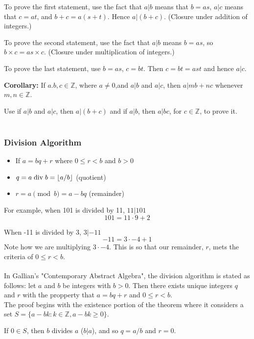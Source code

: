 To prove the first statement, use the fact that $a|b$ means that $b = as$,
$a|c$ means that $c=at$,
and $b+c = a(s+t)$.
Hence $a|(b+c)$.
(Closure under addition of integers.)

To prove the second statement, use the fact that $a|b$ means $b = as$, so $b\times c = as \times c$.
(Closure under multiplication of integers.)

To prove the last statement, use $b = as$, $c = bt$. Then $c = bt = ast$ and hence $a|c$.

\textbf{Corollary:}
If $a. b, c \in \mathbb{Z}$, where $a \neq 0$,and $a|b$ and $a|c$, then $a|mb + nc$ whenever $m, n \in \mathbb{Z}$.

Use if $a|b$ and $a|c$, then $a|(b+c)$ and if $a|b$, then $a|bc$,
for $c \in \mathbb{Z}$, to prove it.
\\~\\


\subsubsection{Division Algorithm}

\begin{itemize}
\item If $a = bq + r$ where $0 \leq r < b$ and $b>0$
\item $q = a \bdiv b = \lfloor a/b \rfloor$ (quotient)
\item $r = a \pmod b = a - bq$ (remainder)
\end{itemize}

For example, when 101 is divided by 11, $11|101$
$$
101 = 11 \cdot 9 + 2
$$

When -11 is divided by 3, $3|-11$
$$
-11 = 3 \cdot -4 + 1
$$
Note how we are multiplying $3\cdot -4$. This is so that our remainder, $r$, mets the criteria
of $0 \leq r < b$.
\\~\\

In Gallian's "Contemporary Abstract Algebra", the division algorithm is stated as follows:
let $a$ and $b$ be integers with $b>0$.
Then there exists unique integers $q$ and $r$ with the propperty that
$a = bq +r$ and $0 \leq r < b$.
\\

The proof begins with the existence portion of the theorem where it considers a set
$S = \{ a - bk : k\in\mathbb{Z}, a - bk \geq 0 \}$.

If $0\in S$, then $b$ divides $a$ ($b|a$), and so $q = a/b$ and $r=0$.

